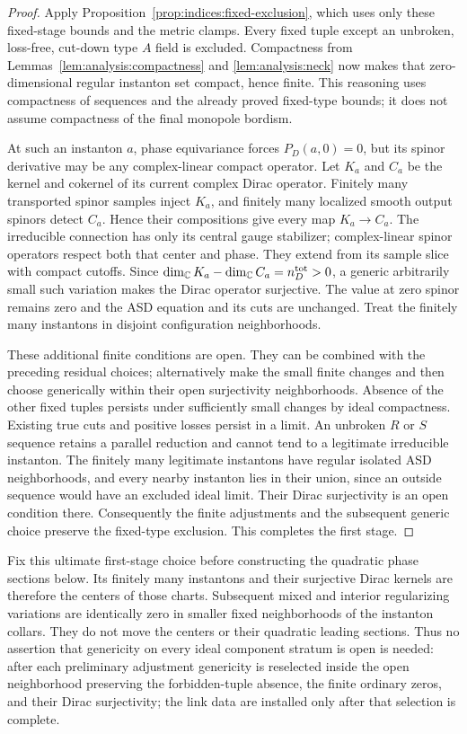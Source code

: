 \begin{proof}
Apply Proposition~\ref{prop:indices:fixed-exclusion}, which uses only
these fixed-stage bounds and the metric clamps.  Every fixed tuple
except an unbroken, loss-free, cut-down type $A$ field is excluded.
Compactness from Lemmas~\ref{lem:analysis:compactness} and
\ref{lem:analysis:neck} now makes that zero-dimensional regular
instanton set compact, hence finite.  This reasoning uses compactness
of sequences and the already proved fixed-type bounds; it does not
assume compactness of the final monopole bordism.

At such an instanton $a$, phase equivariance forces $P_D(a,0)=0$,
but its spinor derivative may be any complex-linear compact operator.
Let $K_a$ and $C_a$ be the kernel and cokernel of its current complex
Dirac operator.  Finitely many transported spinor samples inject
$K_a$, and finitely many localized smooth output spinors detect
$C_a$.  Hence their compositions give every map $K_a\to C_a$.
The irreducible connection has only its central gauge stabilizer;
complex-linear spinor operators respect both that center and phase.
They extend from its sample slice with compact cutoffs.  Since
$\dim_{\mathbb C}K_a-\dim_{\mathbb C}C_a=n_D^{\rm tot}>0$, a generic arbitrarily
small such variation makes the Dirac operator surjective.  The value
at zero spinor remains zero and the ASD equation and its cuts are
unchanged.  Treat the finitely many instantons in disjoint configuration
neighborhoods.

These additional finite conditions are open.  They can be combined
with the preceding residual choices; alternatively make the small
finite changes and then choose generically within their open
surjectivity neighborhoods.  Absence of the other fixed tuples persists
under sufficiently small changes by ideal compactness.  Existing true
cuts and positive losses persist in a limit.  An unbroken $R$ or $S$
sequence retains a parallel reduction and cannot tend to a legitimate
irreducible instanton.  The finitely many legitimate instantons have
regular isolated ASD neighborhoods, and every nearby instanton lies
in their union, since an outside sequence would have an excluded
ideal limit.  Their Dirac surjectivity is an open condition there.
Consequently the finite adjustments and the subsequent generic choice
preserve the fixed-type exclusion.  This completes the first stage.
\end{proof}

Fix this ultimate first-stage choice before constructing the quadratic
phase sections below.  Its finitely many instantons and their
surjective Dirac kernels are therefore the centers of those charts.
Subsequent mixed and interior regularizing variations are identically
zero in smaller fixed neighborhoods of the instanton collars.  They
do not move the centers or their quadratic leading sections.  Thus
no assertion that genericity on every ideal component stratum is open
is needed: after each preliminary adjustment genericity is reselected
inside the open neighborhood preserving the forbidden-tuple absence,
the finite ordinary zeros, and their Dirac surjectivity; the link data
are installed only after that selection is complete.


